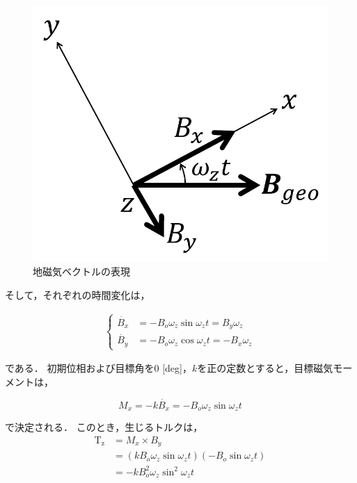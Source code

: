 \begin{figure}[H]
	\centering
		\includegraphics[scale=0.5]{./figure/B-dot1-crop.pdf}
		\caption{地磁気ベクトルの表現}
		\label{fig:geo}
\end{figure}

そして，それぞれの時間変化は，

\begin{align}
    \left\{
        \begin{aligned}
            \dot{B_x} &= -B_o\omega_z\sin\omega_zt = B_y\omega_z\\
            \dot{B_y} &= -B_o\omega_z\cos\omega_zt = -B_x\omega_z
        \end{aligned}                    
    \right.
\end{align}

である．
初期位相および目標角を0 [deg]，$k$を正の定数とすると，目標磁気モーメントは，

\begin{equation}
    M_x = -k\dot{B_x} = -B_o\omega_z\sin\omega_zt
\end{equation}

で決定される．
このとき，生じるトルクは，
\begin{equation}
    \begin{aligned}
        \mathrm{T_z} &= M_x \times B_y\\
                     &= (kB_o\omega_z\sin\omega_zt)(-B_o\sin\omega_zt)\\
                     &= -kB_o^2\omega_z\sin^2\omega_zt
    \end{aligned}
\end{equation}

